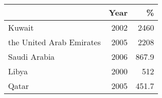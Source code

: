 \scriptsize
\begin{center}
\begin{tabular}{lrr}
\toprule
  & Year & \%\\
\midrule
Kuwait & 2002 & 2460\\
the United Arab Emirates & 2005 & 2208\\
Saudi Arabia & 2006 & 867.9\\
Libya & 2000 & 512\\
Qatar & 2005 & 451.7\\
\toprule
\end{tabular}
\end{center}

